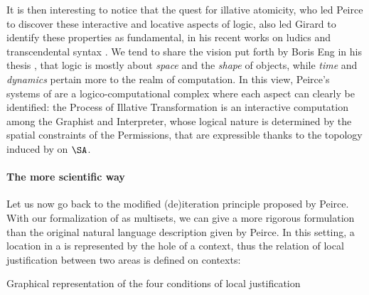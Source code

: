 \begin{scope}
It is then interesting to notice that the quest for illative atomicity, who led
Peirce to discover these interactive and locative aspects of logic, also led
Girard to identify these properties as fundamental, in his recent works on
ludics \cite{girard_locus_2001} and transcendental syntax
\cite{eng_exegesis_2023}. We tend to share the vision put forth by Boris Eng in
his thesis \cite[\S 24.4]{eng_exegesis_2023}, that logic is mostly about
\emph{space} and the \emph{shape} of objects, while \emph{time} and
\emph{dynamics} pertain more to the realm of computation. In this view, Peirce's
systems of  are a logico-computational complex where each aspect can clearly
be identified: the Process of Illative Transformation is an interactive
computation among the Graphist and Interpreter, whose logical nature is
determined by the spatial constraints of the Permissions, that are expressible
thanks to the topology induced by  on $\SA$.

\paragraph{The more scientific way}

Let us now go back to the modified (de)iteration principle proposed by Peirce.
With our formalization of  as multisets, we can give a more rigorous
formulation than the original natural language description given by
Peirce. In this setting, a location in a  is represented by the
hole of a context, thus the relation of local justification between two areas is
defined on contexts:

\begin{marginfigure}
  
  \caption{Graphical representation of the four conditions of local
  justification}
\end{marginfigure}


\end{scope}
